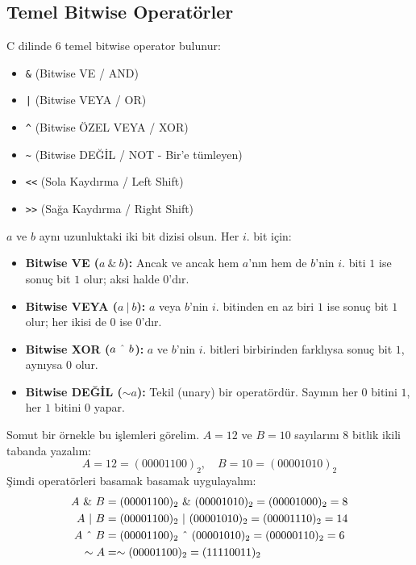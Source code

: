 \subsection{Temel Bitwise Operatörler}

C dilinde 6 temel bitwise operator bulunur:
\begin{itemize}
    \item \lstinline|&| (Bitwise VE / AND)
    \item \lstinline/|/ (Bitwise VEYA / OR)
    \item \lstinline|^| (Bitwise ÖZEL VEYA / XOR)
    \item \lstinline|~| (Bitwise DEĞİL / NOT - Bir'e tümleyen)
    \item \lstinline|<<| (Sola Kaydırma / Left Shift)
    \item \lstinline|>>| (Sağa Kaydırma / Right Shift)
\end{itemize}

\begin{definition}
$a$ ve $b$ aynı uzunluktaki iki bit dizisi olsun. Her $i$. bit için:
\begin{itemize}
    \item \textbf{Bitwise VE ($a \ \& \ b$):} Ancak ve ancak hem $a$'nın hem de $b$'nin $i$. biti $1$ ise sonuç bit $1$ olur; aksi halde $0$'dır.
    \item \textbf{Bitwise VEYA ($a \ | \ b$):} $a$ veya $b$'nin $i$. bitinden en az biri $1$ ise sonuç bit $1$ olur; her ikisi de $0$ ise $0$'dır.
    \item \textbf{Bitwise XOR ($a \ \string^\ b$):} $a$ ve $b$'nin $i$. bitleri birbirinden farklıysa sonuç bit $1$, aynıysa $0$ olur.
    \item \textbf{Bitwise DEĞİL ($\sim a$):} Tekil (unary) bir operatördür. Sayının her $0$ bitini $1$, her $1$ bitini $0$ yapar.
\end{itemize}
\end{definition}

Somut bir örnekle bu işlemleri görelim. $A = 12$ ve $B = 10$ sayılarını 8 bitlik ikili tabanda yazalım:
\[
A = 12 = (00001100)_2, \quad B = 10 = (00001010)_2
\]
Şimdi operatörleri basamak basamak uygulayalım:
\begin{align*}
A \ \& \ B &= (00001100)_2 \ \& \ (00001010)_2 = (00001000)_2 = 8 \\
A \ | \ B &= (00001100)_2 \ | \ (00001010)_2 = (00001110)_2 = 14 \\
A \ \string^\ B &= (00001100)_2 \ \string^\ (00001010)_2 = (00000110)_2 = 6 \\
\sim A &= \sim (00001100)_2 = (11110011)_2
\end{align*}

